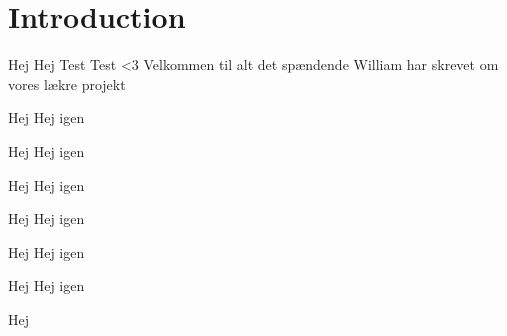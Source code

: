 \chapter{Introduction}
Hej Hej Test Test <3
Velkommen til alt det spændende William har skrevet om vores lækre projekt



\begin{defn}{Hej}
Hej igen
\end{defn}

\begin{thmx}{Hej}
Hej igen
\end{thmx}


\begin{lem}{Hej}
Hej igen
\end{lem}

\begin{prop}{Hej}
Hej igen
\end{prop}

\begin{kor}{Hej}
Hej igen
\end{kor}

\begin{exmp}{Hej}
Hej igen
\end{exmp}

\begin{bev}
Hej
\end{bev}